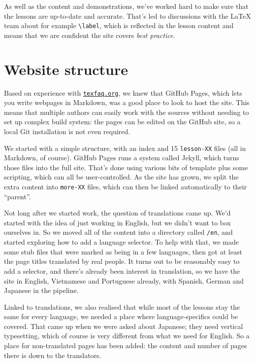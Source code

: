 \documentclass[harvardcite]{ltugboat}
\begin{document}
As well as the content and demonstrations, we've worked hard to make sure that
the lessons are up-to-date and accurate. That's led to discussions with the
\LaTeX{} team about for example \verb|\label|, which is reflected in the lesson
content and means that we are confident the site covers \emph{best practice}.

\section{Website structure}

Based on experience with \href{https://texfaq.org}{\nolinkurl{texfaq.org}}, we knew that GitHub Pages, which
lets you write webpages in Markdown, was a good place to look to host the site.
This means that multiple authors can easily work with the sources without
needing to set up complex build system: the pages can be edited on the GitHub
site, so a local Git installation is not even required.

We started with a simple structure, with an index and 15 \texttt{lesson-XX}
files (all in Markdown, of course). GitHub Pages runs a system called Jekyll,
which turns those files into the full site. That's done using various bits of
template plus some scripting, which can all be user-controlled. As the site has
grown, we split the extra content into \texttt{more-XX} files, which can then
be linked automatically to their \enquote{parent}.

Not long after we started work, the question of translations came up. We'd started
with the idea of just working in English, but we didn't want to box ourselves in.
So we moved all of the content into a directory called \texttt{/en}, and started
exploring how to add a language selector. To help with that, we made some stub
files that were marked as being in a few languages, then got at least the
page titles translated by real people. It turns out to be reasonably easy
to add a selector, and there's already been interest in translation, so
we have the site in English, Vietnamese and Portuguese already, with Spanish,
German and Japanese in the pipeline.

Linked to translations, we also realised that while most of the lessons stay
the same for every language, we needed a place where language-specifics could
be covered. That came up when we were asked about Japanese; they need vertical
typesetting, which of course is very different from what we need for English.
So a place for non-translated pages has been added: the content and number of
pages there is down to the translators.
\end{document}

